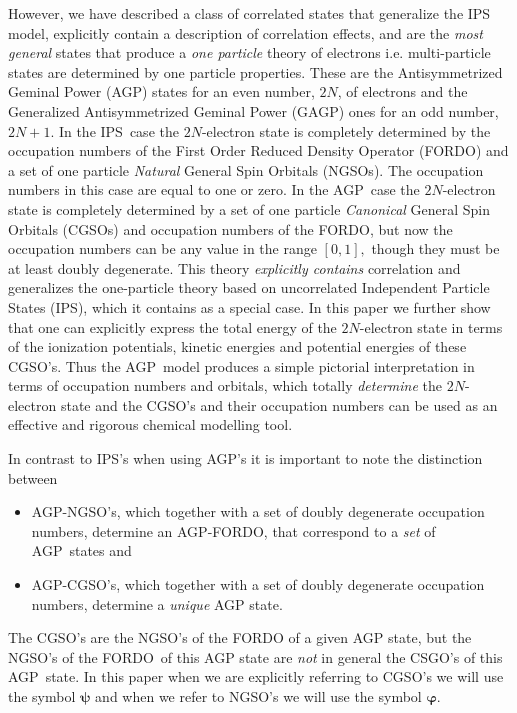 \documentclass[aps,preprint]{revtex4}%
\begin{document}
However, we have described \cite{Weiner&ortiz04} a class of correlated states
that generalize the IPS model, explicitly contain a description of correlation
effects, and are the \emph{most general} states that produce a \emph{one
particle} theory of electrons i.e. multi-particle states are determined by one
particle properties. These are the Antisymmetrized Geminal Power (AGP) states
for an even number, $2N$, of electrons and the Generalized Antisymmetrized
Geminal Power (GAGP) ones for an odd number, $2N+1$. In the IPS\ case the
$2N$-electron state is completely determined by the occupation numbers of the
First Order Reduced Density Operator (FORDO) and a set of one particle
\emph{Natural }General Spin Orbitals (NGSOs). The occupation numbers in this
case are equal to one or zero. In the AGP\ case the $2N$-electron state is
completely determined by a set of one particle \emph{Canonical }General Spin
Orbitals (CGSOs) and occupation numbers of the FORDO, but now the occupation
numbers can be any value in the range $\left[  0,1\right]  ,$ though they must
be at least doubly degenerate. This theory \emph{explicitly contains}
correlation and generalizes the one-particle theory based on uncorrelated
Independent Particle States (IPS), which it contains as a special case. In
this paper we further show that one can explicitly express the total energy of
the $2N$-electron state in terms of the ionization potentials, kinetic
energies and potential energies of these CGSO's. Thus the AGP\ model produces
a simple pictorial interpretation in terms of occupation numbers and orbitals,
which totally \emph{determine} the $2N$-electron state and the CGSO's and
their occupation numbers can be used as an effective and rigorous chemical
modelling tool.

In contrast to IPS's when using AGP's it is important to note the distinction between

\begin{itemize}
\item AGP-NGSO's, which together with a set of doubly degenerate occupation
numbers, determine an AGP-FORDO, that correspond to a \emph{set }of
AGP\ states and

\item AGP-CGSO's, which together with a set of doubly degenerate occupation
numbers, determine a \emph{unique} AGP state.
\end{itemize}

The CGSO's are the NGSO's of the FORDO of a given AGP state, but the NGSO's of
the FORDO\ of this AGP state are \emph{not }in general the CSGO's of this
AGP\ state. In this paper when we are explicitly referring to CGSO's we will
use the symbol $\bm{\psi}$ and when we refer to NGSO's we will use the symbol
$\bm{\varphi.}$
\end{document}
